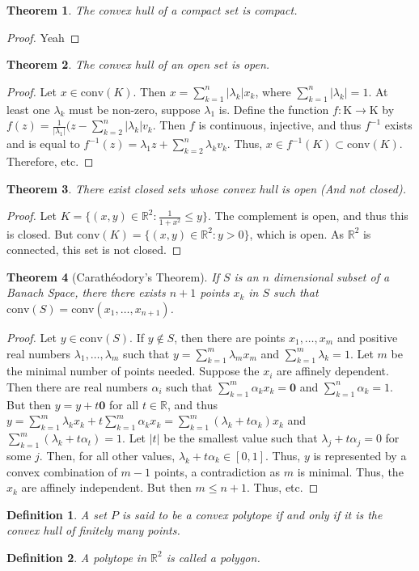 \documentclass[12pt,oneside]{book}
\theoremstyle{mystyle}
\newtheorem{theorem}{Theorem}[section]
\newtheorem{definition}{Definition}[section]
\begin{document}
%
\begin{theorem}
The convex hull of a compact set is compact.
\end{theorem}
\begin{proof}
Yeah
\end{proof}
%
\begin{theorem}
The convex hull of an open set is open.
\end{theorem}
\begin{proof}
Let $x\in \textrm{conv}(K)$. Then $x=\sum_{k=1}^{n}|\lambda_k| x_k$, where $\sum_{k=1}^{n}|\lambda_k| = 1$. At least one $\lambda_k$ must be non-zero, suppose $\lambda_1$ is. Define the function $f:\textrm{K}\rightarrow \textrm{K}$ by $f(z) = \frac{1}{|\lambda_1|}(z-\sum_{k=2}^{n}|\lambda_k|v_k$. Then $f$ is continuous, injective, and thus $f^{-1}$ exists and is equal to $f^{-1}(z) = \lambda_1 z +\sum_{k=2}^{n}\lambda_k v_k$. Thus, $x\in f^{-1}(K)\subset\textrm{conv}(K)$. Therefore, etc. 
\end{proof}
%
\begin{theorem}
There exist closed sets whose convex hull is open (And not closed).
\end{theorem}
\begin{proof}
Let $K = \{(x,y)\in \mathbb{R}^2:\frac{1}{1+x^2}\leq y\}$. The complement is open, and thus this is closed. But $\textrm{conv}(K) = \{(x,y)\in \mathbb{R}^2:y>0\}$, which is open. As $\mathbb{R}^2$ is connected, this set is not closed.
\end{proof}
%
\begin{theorem}[Carath\'{e}odory's Theorem]
If $S$ is an $n$ dimensional subset of a Banach Space, there there exists $n+1$ points $x_k$ in $S$ such that $\textrm{conv}(S) = \textrm{conv}(x_1,\hdots, x_{n+1})$.
\end{theorem}
\begin{proof}
Let $y\in \textrm{conv}(S)$. If $y\notin S$, then there are points $x_1,\hdots, x_m$ and positive real numbers $\lambda_1,\hdots, \lambda_m$ such that $y=\sum_{k=1}^{m}\lambda_m x_m$ and $\sum_{k=1}^{m}\lambda_k = 1$. Let $m$ be the minimal number of points needed. Suppose the $x_i$ are affinely dependent. Then there are real numbers $\alpha_i$ such that $\sum_{k=1}^{m}\alpha_k x_k = \mathbf{0}$ and $\sum_{k=1}^{n}\alpha_k =1$. But then $y = y+t\mathbf{0}$ for all $t\in \mathbb{R}$, and thus $y = \sum_{k=1}^{m}\lambda_k x_k + t\sum_{k=1}^{m}\alpha_k x_k = \sum_{k=1}^{m}(\lambda_k + t\alpha_k)x_k$ and $\sum_{k=1}^{m}(\lambda_k+t\alpha_t) = 1$. Let $|t|$ be the smallest value such that $\lambda_j + t\alpha_j = 0$ for some $j$. Then, for all other values, $\lambda_k + t\alpha_k \in [0,1]$. Thus, $y$ is represented by a convex combination of $m-1$ points, a contradiction as $m$ is minimal. Thus, the $x_k$ are affinely independent. But then $m \leq n+1$. Thus, etc.
\end{proof}
%
\begin{definition}
A set $P$ is said to be a convex polytope if and only if it is the convex hull of finitely many points.
\end{definition}
%
\begin{definition}
A polytope in $\mathbb{R}^2$ is called a polygon.
\end{definition}
\end{document}
